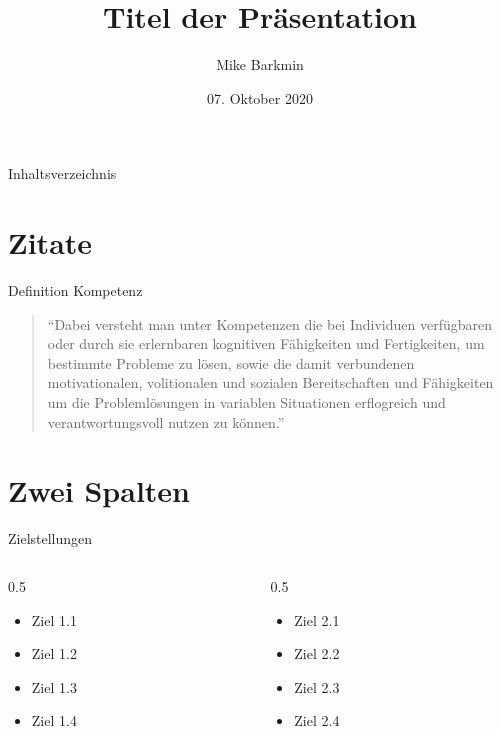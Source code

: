 \documentclass[aspectratio=169, ngerman]{udeddi}
\title{Titel der Präsentation}
\author{Mike Barkmin}
\date{07. Oktober 2020}
\begin{document}
\maketitle

\begin{frame}{Inhaltsverzeichnis}
  \maintableofcontents
\end{frame}

\section{Zitate}
\begin{frame}{Definition Kompetenz \citep{weinert_vergleichende_2001}}
    \begin{quote}
        \enquote{Dabei versteht man unter Kompetenzen die bei Individuen verfügbaren
            oder durch sie erlernbaren kognitiven Fähigkeiten und Fertigkeiten,
            um bestimmte Probleme zu lösen, sowie die damit verbundenen
            motivationalen, volitionalen und sozialen Bereitschaften und
            Fähigkeiten um die Problemlösungen in variablen Situationen
            erflogreich und verantwortungsvoll nutzen zu können.}
    \end{quote}
\end{frame}

\section{Zwei Spalten}
\begin{frame}{Zielstellungen}
    \begin{columns}
        \begin{column}{0.5\textwidth}
            \begin{itemize}
                \item Ziel 1.1
                \item Ziel 1.2
                \item Ziel 1.3
                \item Ziel 1.4
            \end{itemize}
        \end{column}
        \begin{column}{0.5\textwidth}
            \begin{itemize}
                \item Ziel 2.1
                \item Ziel 2.2
                \item Ziel 2.3
                \item Ziel 2.4
            \end{itemize}
        \end{column}
    \end{columns}
\end{frame}
\end{document}
